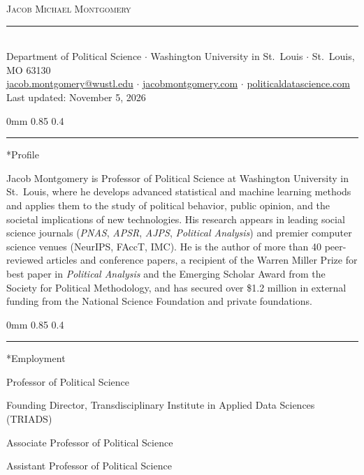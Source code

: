 \documentclass[10pt]{article}
\makeatletter
\renewcommand{\section}{\@startsection{section}{12}
{0mm}
{0.85\baselineskip}
{0.4\baselineskip}
{\large\bfseries\scshape\hrule\vspace{0.45\baselineskip}}}
\renewenvironment{CV}
  {\begin{list}{}
    {\renewcommand{\makelabel}{\entrylabel}
    \setlength{\labelwidth}{55pt}
    \setlength{\leftmargin}{62pt}
    \setlength{\itemsep}{2pt}
    \setlength{\parsep}{0pt}
  }}
  {\end{list}}
\makeatother
\begin{document}
\begin{center}
{\LARGE\scshape Jacob Michael Montgomery}\\[0.4em]
{\rule{\linewidth}{0.8pt}}\\[0.3em]
{\small Department of Political Science $\cdot$ Washington University in St.\ Louis $\cdot$ St.\ Louis, MO 63130}\\[0.2em]
{\small \href{mailto:jacob.montgomery@wustl.edu}{jacob.montgomery@wustl.edu} $\cdot$ \href{http://jacobmontgomery.com}{jacobmontgomery.com} $\cdot$ \href{http://politicaldatascience.com}{politicaldatascience.com}}\\[0.2em]
{\small Last updated: November 5, 2026}
\end{center}


\section*{Profile}

\noindent Jacob Montgomery is Professor of Political Science at Washington University in St.\ Louis, where he develops advanced statistical and machine learning methods and applies them to the study of political behavior, public opinion, and the societal implications of new technologies. His research appears in leading social science journals (\textit{PNAS}, \textit{APSR}, \textit{AJPS}, \textit{Political Analysis}) and premier computer science venues (NeurIPS, FAccT, IMC). He is the author of more than 40 peer-reviewed articles and conference papers, a recipient of the Warren Miller Prize for best paper in \textit{Political Analysis} and the Emerging Scholar Award from the Society for Political Methodology, and has secured over \$1.2 million in external funding from the National Science Foundation and private foundations.

\vspace{2pt}


\section*{Employment}

\begin{CV}
\item[\textsc{Washington University in St.\ Louis}]
\item[2023--] Professor of Political Science
\item[2022--2024] Founding Director, Transdisciplinary Institute in Applied Data Sciences (TRIADS)
\item[2017--2023] Associate Professor of Political Science
\item[2011--2017] Assistant Professor of Political Science
\end{CV}
\end{document}
